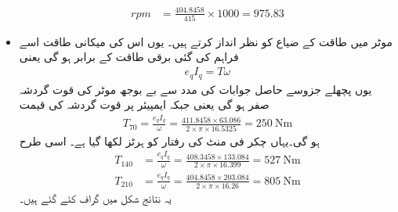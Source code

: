 \begin{itemize}
\begin{align*}
rpm&=\frac{404.8458}{415} \times 1000=975.83
\end{align*}
%
\item
موٹر میں طاقت کے ضیاع کو نظر انداز کرتے ہیں۔ یوں اس کی میکانی طاقت اسے فراہم کی گئی برقی طاقت کے برابر ہو گی یعنی
\begin{align}
e_q I_q=T \omega
\end{align}
یوں پچھلے جزوسے حاصل جوابات کی مدد سے بے بوجھ موٹر کی قوت گردشہ  صفر ہو گی یعنی   جبکہ   ایمپیئر پر قوت گردشہ کی قیمت
\begin{align*}
T_{70}=\frac{e_q I_q}{\omega}=\frac{411.8458 \times 63.086}{2 \times \pi \times 16.5325}=\SI{250}{\newton \meter}
\end{align*}
ہو گی۔یہاں  چکر فی منٹ کی رفتار کو  ہرٹز لکھا گیا ہے۔ اسی طرح
\begin{align*}
T_{140}&=\frac{e_q I_q}{\omega}=\frac{408.3458 \times 133.084}{2 \times \pi \times 16.399}=\SI{527}{\newton \meter}\\
T_{210}&=\frac{e_q I_q}{\omega}=\frac{404.8458 \times  203.084}{2 \times \pi \times 16.26}=\SI{805}{\newton \meter}
\end{align*}
یہ نتائج شکل   میں گراف کئے گئے ہیں۔
\end{itemize}

